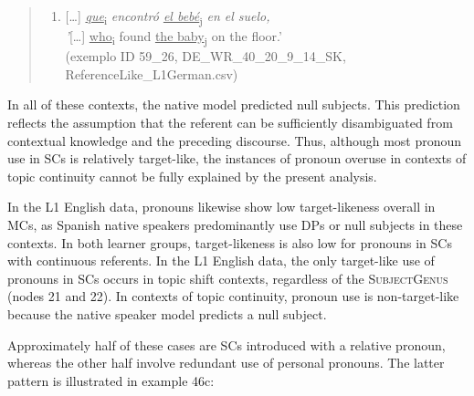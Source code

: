 \documentclass[
  letterpaper,
  DIV=11,
  numbers=noendperiod]{scrartcl}
\providecommand{\tightlist}{%
  \setlength{\itemsep}{0pt}\setlength{\parskip}{0pt}}
\begin{document}
\begin{quote}
\begin{enumerate}
\def\labelenumi{\arabic{enumi}.}
\setcounter{enumi}{43}
\tightlist
\item
  {[}\ldots{]} \ul{\emph{que}}\textsubscript{i} \emph{encontró \ul{el
  bebé}}\textsubscript{j} \emph{en el suelo,\\
  '}{[}\ldots{]} \ul{who}\textsubscript{i} found \ul{the
  baby}\textsubscript{j} on the floor.'\\
  (exemplo ID 59\_26, DE\_WR\_40\_20\_9\_14\_SK,
  ReferenceLike\_L1German.csv)
\end{enumerate}
\end{quote}

In all of these contexts, the native model predicted null subjects. This
prediction reflects the assumption that the referent can be sufficiently
disambiguated from contextual knowledge and the preceding discourse.
Thus, although most pronoun use in SCs is relatively target-like, the
instances of pronoun overuse in contexts of topic continuity cannot be
fully explained by the present analysis.

In the L1 English data, pronouns likewise show low target-likeness
overall in MCs, as Spanish native speakers predominantly use DPs or null
subjects in these contexts. In both learner groups, target-likeness is
also low for pronouns in SCs with continuous referents. In the L1
English data, the only target-like use of pronouns in SCs occurs in
topic shift contexts, regardless of the \textsc{SubjectGenus} (nodes 21
and 22). In contexts of topic continuity, pronoun use is non-target-like
because the native speaker model predicts a null subject.

Approximately half of these cases are SCs introduced with a relative
pronoun, whereas the other half involve redundant use of personal
pronouns. The latter pattern is illustrated in example 46c:
\end{document}
